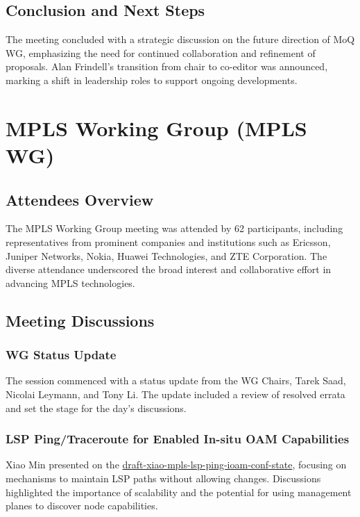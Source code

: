 \documentclass{article}
\begin{document}
\subsection{Conclusion and Next Steps}
The meeting concluded with a strategic discussion on the future direction of MoQ WG, emphasizing the need for continued collaboration and refinement of proposals. Alan Frindell's transition from chair to co-editor was announced, marking a shift in leadership roles to support ongoing developments.



\newpage

\section{MPLS Working Group (MPLS WG)}

\subsection{Attendees Overview}
The MPLS Working Group meeting was attended by 62 participants, including representatives from prominent companies and institutions such as Ericsson, Juniper Networks, Nokia, Huawei Technologies, and ZTE Corporation. The diverse attendance underscored the broad interest and collaborative effort in advancing MPLS technologies.

\subsection{Meeting Discussions}

\subsubsection{WG Status Update}
The session commenced with a status update from the WG Chairs, Tarek Saad, Nicolai Leymann, and Tony Li. The update included a review of resolved errata and set the stage for the day's discussions.

\subsubsection{LSP Ping/Traceroute for Enabled In-situ OAM Capabilities}
Xiao Min presented on the \href{https://datatracker.ietf.org/doc/draft-xiao-mpls-lsp-ping-ioam-conf-state}{draft-xiao-mpls-lsp-ping-ioam-conf-state}, focusing on mechanisms to maintain LSP paths without allowing changes. Discussions highlighted the importance of scalability and the potential for using management planes to discover node capabilities.
\end{document}
